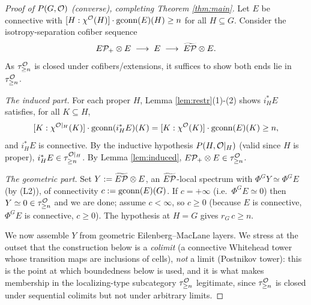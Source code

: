 \begin{proof}[Proof of $P(G,\mathcal{O})$ (converse), completing Theorem \ref{thm:main}]
Let $E$ be connective with $[H:\chi^{\mathcal{O}}(H)]\cdot\operatorname{gconn}(E)(H)\ge n$ for all
$H\subseteq G$. Consider the isotropy-separation cofiber sequence
\[
E\mathcal P_+\otimes E\;\longrightarrow\; E\;\longrightarrow\;\widetilde{E\mathcal P}\otimes E .
\]
As $\tau^{\mathcal{O}}_{\ge n}$ is closed under cofibers/extensions, it suffices to show
both ends lie in $\tau^{\mathcal{O}}_{\ge n}$.

\emph{The induced part.} For each proper $H$, Lemma \ref{lem:restr}(1)-(2) shows
$i_H^\ast E$ satisfies, for all $K\subseteq H$,
\[
[K:\chi^{\mathcal{O}|_H}(K)]\cdot\operatorname{gconn}(i_H^\ast E)(K)
=[K:\chi^{\mathcal{O}}(K)]\cdot\operatorname{gconn}(E)(K)\ge n ,
\]
and $i_H^\ast E$ is connective. By the inductive hypothesis $P(H,\mathcal{O}|_H)$ (valid
since $H$ is proper), $i_H^\ast E\in\tau^{\mathcal{O}|_H}_{\ge n}$. By Lemma
\ref{lem:induced}, $E\mathcal P_+\otimes E\in\tau^{\mathcal{O}}_{\ge n}$.

\emph{The geometric part.} Set $Y:=\widetilde{E\mathcal P}\otimes E$, an $\widetilde{E\mathcal P}$-local spectrum with
$\Phi^G Y\simeq\Phi^G E$ (by (L2)), of connectivity $c:=\operatorname{gconn}(E)(G)$. If
$c=+\infty$ (i.e.\ $\Phi^G E\simeq 0$) then $Y\simeq 0\in\tau^{\mathcal{O}}_{\ge n}$ and we are
done; assume $c<\infty$, so $c\ge 0$ (because $E$ is connective, $\Phi^G E$ is
connective, $c\ge0$). The hypothesis at $H=G$ gives $r_G\,c\ge n$.

We now assemble $Y$ from geometric Eilenberg--MacLane layers. We stress at the
outset that the construction below is a \emph{colimit} (a connective Whitehead
tower whose transition maps are inclusions of cells), \emph{not} a limit
(Postnikov tower): this is the point at which boundedness below is used, and it
is what makes membership in the localizing-type subcategory $\tau^{\mathcal{O}}_{\ge n}$
legitimate, since $\tau^{\mathcal{O}}_{\ge n}$ is closed under sequential colimits but not
under arbitrary limits.


\end{proof}
